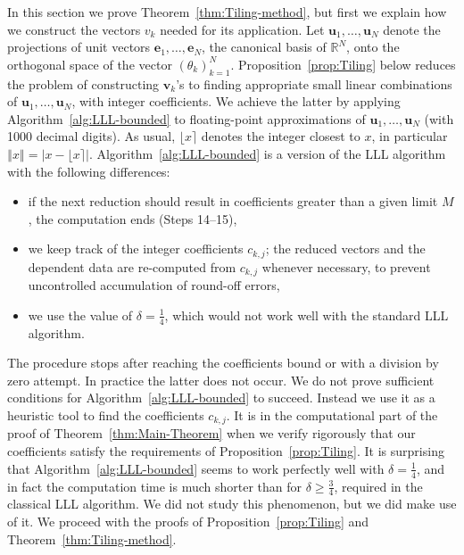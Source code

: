 \documentclass[oneside,english]{amsart}
\numberwithin{equation}{section}
\numberwithin{figure}{section}
\theoremstyle{plain}
\theoremstyle{plain}
\theoremstyle{plain}
\theoremstyle{definition}
\begin{document}
In this section we prove Theorem~\ref{thm:Tiling-method}, but first
we explain how we construct the vectors $v_{k}$ needed for its application.
Let $\boldsymbol{u}_{1},\dotsc,\boldsymbol{u}_{N}$ denote the projections
of unit vectors $\boldsymbol{e}_{1},\dotsc,\boldsymbol{e}_{N}$, the
canonical basis of $\mathbb{R}^{N}$, onto the orthogonal space of
the vector $\left(\theta_{k}\right)_{k=1}^{N}$. Proposition~\ref{prop:Tiling}
below reduces the problem of constructing $\boldsymbol{v}_{k}$'s
to finding appropriate small linear combinations of $\boldsymbol{u}_{1},\dotsc,\boldsymbol{u}_{N}$,
with integer coefficients. We achieve the latter by applying Algorithm~\ref{alg:LLL-bounded}
to floating-point approximations of $\boldsymbol{u}_{1},\dotsc,\boldsymbol{u}_{N}$
(with 1000 decimal digits). As usual, $\lfloor x\rceil$ denotes the
integer closest to $x$, in particular $\left\Vert x\right\Vert =\left|x-\lfloor x\rceil\right|$.
Algorithm~\ref{alg:LLL-bounded} is a version of the LLL algorithm~\cite[p. 444]{HoffsteinPipherSilverman2014}
with the following differences:
\begin{itemize}
\item if the next reduction should result in coefficients greater than a
given limit $M$, the computation ends (Steps 14--15),
\item we keep track of the integer coefficients $c_{k,j}$; the reduced
vectors and the dependent data are re-computed from $c_{k,j}$ whenever
necessary, to prevent uncontrolled accumulation of round-off errors,
\item we use the value of $\delta=\frac{1}{4}$, which would not work well
with the standard LLL algorithm.
\end{itemize}
The procedure stops after reaching the coefficients bound or with
a division by zero attempt. In practice the latter does not occur.
We do not prove sufficient conditions for Algorithm~\ref{alg:LLL-bounded}
to succeed. Instead we use it as a heuristic tool to find the coefficients
$c_{k,j}$. It is in the computational part of the proof of Theorem~\ref{thm:Main-Theorem}
when we verify rigorously that our coefficients satisfy the requirements
of Proposition~\ref{prop:Tiling}. It is surprising that Algorithm~\ref{alg:LLL-bounded}
seems to work perfectly well with $\delta=\frac{1}{4}$, and in fact
the computation time is much shorter than for $\delta\geq\frac{3}{4}$,
required in the classical LLL algorithm. We did not study this phenomenon,
but we did make use of it. We proceed with the proofs of Proposition~\ref{prop:Tiling}
and Theorem~\ref{thm:Tiling-method}.
\end{document}
